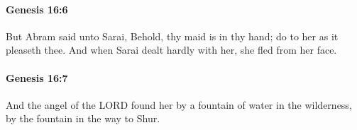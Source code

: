 		\paragraph{Genesis 16:6} %
			\label{GENESIS-16-6}

			But Abram said unto Sarai, Behold, thy maid is in thy hand; do to her as it pleaseth thee. And when Sarai dealt hardly with her, she fled from her face.


		\paragraph{Genesis 16:7} %
			\label{GENESIS-16-7}

			And the angel of the LORD found her by a fountain of water in the wilderness, by the fountain in the way to Shur.


